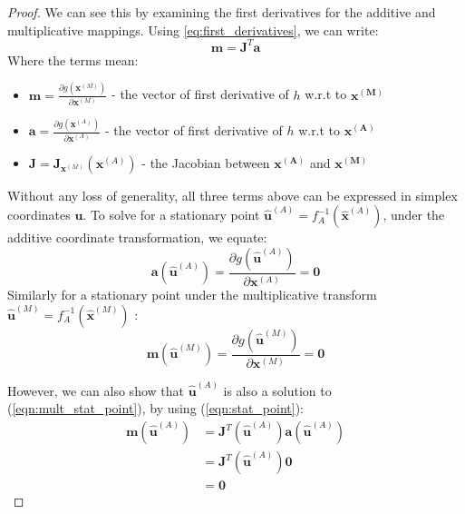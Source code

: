 \begin{proof}
    We can see this by examining the first derivatives for the additive and multiplicative mappings. Using \ref{eq:first_derivatives}, we can write: 
    \begin{equation} \label{eqn:stat_point}
        \mathbf{m} = \mathbf{J}^T  \mathbf{a} 
    \end{equation} 
    Where the terms mean: 
    \begin{itemize}
        \item \( \mathbf{m} = \frac{\partial g(\mathbf{x}^{(M)})}{\partial \mathbf{x}^{(M)}} \) - the vector of first derivative of \(h\) w.r.t to \(\mathbf{x^{(M)}}\)
        \item \( \mathbf{a} = \frac{\partial g(\mathbf{x}^{(A)})}{\partial \mathbf{x}^{(A)}} \) - the vector of first derivative of \(h\) w.r.t to \(\mathbf{x^{(A)}}\)
        \item \( \mathbf{J} = \mathbf{J}_{\mathbf{x}^{(M)}}(\mathbf{x}^{(A)}) \) - the Jacobian between \(\mathbf{x^{(A)}}\) and \(\mathbf{x^{(M)}}\)
    \end{itemize}
    
    Without any loss of generality, all three terms above can be expressed in simplex coordinates \(\mathbf{u}\). To solve for a stationary point \(\mathbf{\hat{u}}^{(A)} = f_A^{-1}(\hat{\mathbf{x}}^{(A)})\), under the additive coordinate transformation, we equate:
    \begin{equation} \label{eqn:add_stat_point} 
        \mathbf{a}(\mathbf{\hat{u}}^{(A)}) = \frac{\partial g(\mathbf{\hat{u}}^{(A)})}{\partial \mathbf{x}^{(A)}} = \mathbf{0} 
    \end{equation}
    Similarly for a stationary point under the multiplicative transform \(\mathbf{\hat{u}}^{(M)} = f_A^{-1}(\hat{\mathbf{x}}^{(M)}) \) : 
    \begin{equation} \label{eqn:mult_stat_point} 
        \mathbf{m}(\mathbf{\hat{u}}^{(M)}) = \frac{\partial g(\mathbf{\hat{u}}^{(M)})}{\partial \mathbf{x}^{(M)}} = \mathbf{0} 
    \end{equation}
    
    However, we can also show that \(\mathbf{\hat{u}}^{(A)}\) is also a solution to (\ref{eqn:mult_stat_point}), by using (\ref{eqn:stat_point}):
    \begin{equation}
        \begin{split}
            \mathbf{m}(\mathbf{\hat{u}}^{(A)}) & = \mathbf{J}^T (\mathbf{\hat{u}}^{(A)})  \mathbf{a} (\mathbf{\hat{u}}^{(A)}) \\ 
            & = \mathbf{J}^T (\mathbf{\hat{u}}^{(A)})  \mathbf{0}\\
            & = \mathbf{0}
        \end{split}
    \end{equation}
    

\end{proof}
